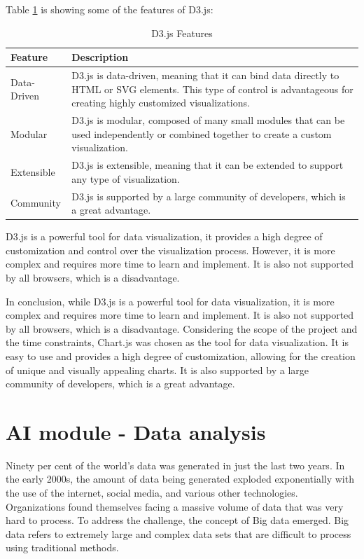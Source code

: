 Table \ref{tab:d3-js-features} is showing some of the features of D3.js\cite{d3}:

\begin{table}[H]
    \centering
    
    \begin{tabularx}{\textwidth}{|l|X|}
        \hline
        \textbf{Feature} & \textbf{Description} \\
        \hline
        Data-Driven & D3.js is data-driven, meaning that it can bind data directly to HTML or SVG elements. This type of control is advantageous for creating highly customized visualizations. \\
        \hline
        Modular & D3.js is modular, composed of many small modules that can be used independently or combined together to create a custom visualization. \\
        \hline
        Extensible & D3.js is extensible, meaning that it can be extended to support any type of visualization. \\
        \hline
        Community & D3.js is supported by a large community of developers, which is a great advantage. \\
        \hline
    \end{tabularx}
    \label{tab:d3-js-features}
    \caption{D3.js Features}
\end{table}


D3.js is a powerful tool for data visualization, it provides a high degree of customization and control over the visualization process. However, it is more complex and requires more time to learn and implement. It is also not supported by all browsers, which is a disadvantage.

In conclusion, while D3.js is a powerful tool for data visualization, it is more complex and requires more time to learn and implement. It is also not supported by all browsers, which is a disadvantage. Considering the scope of the project and the time constraints, Chart.js was chosen as the tool for data visualization. It is easy to use and provides a high degree of customization, allowing for the creation of unique and visually appealing charts. It is also supported by a large community of developers, which is a great advantage.

\section{AI module - Data analysis}
Ninety per cent of the world's data was generated in just the last two years. In the early 2000s, the amount of data being generated exploded exponentially with the use of the internet, social media, and various other technologies. Organizations found themselves facing a massive volume of data that was very hard to process. To address the challenge, the concept of Big data emerged. Big data refers to extremely large and complex data sets that are difficult to process using traditional methods. \cite{bigdata}

